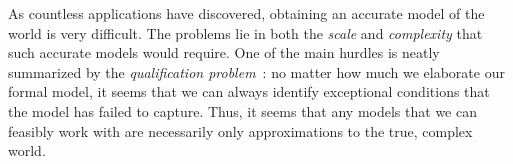 \documentclass[12pt]{article}
\begin{document}





As countless applications have discovered, obtaining an accurate model of the world is very difficult. The problems lie in both the {\em scale} and {\em complexity} that such accurate models would require. One of the main hurdles is neatly summarized by the {\em qualification problem}~\cite{mccarthy1987epistemological}: no matter how much we elaborate our formal model, it seems that we can always identify exceptional conditions that the model has failed to capture. Thus, it seems that any models that we can feasibly work with are necessarily only approximations to the true, complex world. 
\end{document}
